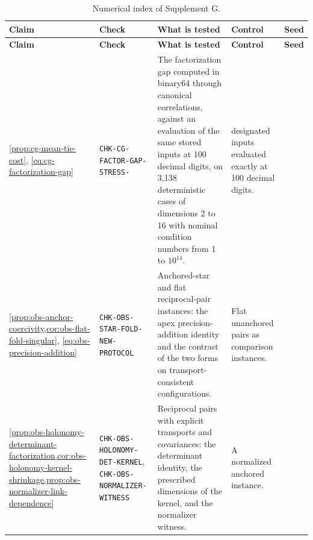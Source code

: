 {\footnotesize
\renewcommand{\arraystretch}{1.12}
\begin{longtable}{@{}>{\raggedright\arraybackslash}p{}
>{\raggedright\arraybackslash}p{}
>{\raggedright\arraybackslash}p{}
>{\raggedright\arraybackslash}p{}
>{\raggedright\arraybackslash}p{}@{}}
\caption{Numerical index of Supplement G.}
\label{tab:gaussian-numerical}\\
\toprule
\textbf{Claim} & \textbf{Check} & \textbf{What is tested} & \textbf{Control} & \textbf{Seed} \\
\midrule
\endfirsthead
\toprule
\textbf{Claim} & \textbf{Check} & \textbf{What is tested} & \textbf{Control} & \textbf{Seed} \\
\midrule
\endhead
\bottomrule
\endlastfoot
\cref{prop:cg-mean-tie-cost}, \eqref{eq:cg-factorization-gap} & \texttt{CHK-CG-FACTOR-\allowbreak GAP-\allowbreak STRESS-\allowbreak 3138} & The factorization gap computed in binary64 through canonical correlations, against an evaluation of the same stored inputs at 100 decimal digits, on 3,138 deterministic cases of dimensions 2 to 16 with nominal condition numbers from 1 to $10^{14}$. & 18 designated inputs evaluated exactly at 100 decimal digits. & 20260803 \\
\cref{prop:obs-anchor-coercivity,cor:obs-flat-fold-singular}, \eqref{eq:obs-precision-addition} & \texttt{CHK-OBS-\allowbreak STAR-\allowbreak FOLD-\allowbreak NEW-\allowbreak PROTOCOL} & Anchored-star and flat reciprocal-pair instances: the apex precision-addition identity and the contrast of the two forms on transport-consistent configurations. & Flat unanchored pairs as comparison instances. & 20260728 \\
\cref{prop:obs-holonomy-determinant-factorization,cor:obs-holonomy-kernel-shrinkage,prop:obs-normalizer-link-dependence} & \texttt{CHK-OBS-\allowbreak HOLONOMY-\allowbreak DET-\allowbreak KERNEL}, \texttt{CHK-OBS-\allowbreak NORMALIZER-\allowbreak WITNESS} & Reciprocal pairs with explicit transports and covariances: the determinant identity, the prescribed dimensions of the kernel, and the normalizer witness. & A normalized anchored instance. & 20260728 \\
\end{longtable}
}
